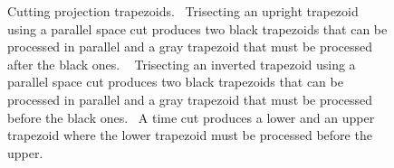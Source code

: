 \begin{figure}
\centering
{}
%
\vspace{-0.3cm}
\caption{Cutting projection
  trapezoids. ~Trisecting an upright
  trapezoid using a parallel space cut produces two black trapezoids
  that can be processed in parallel and a gray trapezoid that must be
  processed after the black ones.  ~
  Trisecting an inverted trapezoid using a parallel space cut produces
  two black trapezoids that can be processed in parallel and a gray
  trapezoid that must be processed before the black ones.
  ~A time cut produces a lower and an upper
  trapezoid where the lower trapezoid must be processed before the
  upper.}
\label{fig:Cut}
\end{figure}
\newcommand{\semi}{;\hspace{0.5em}} 

